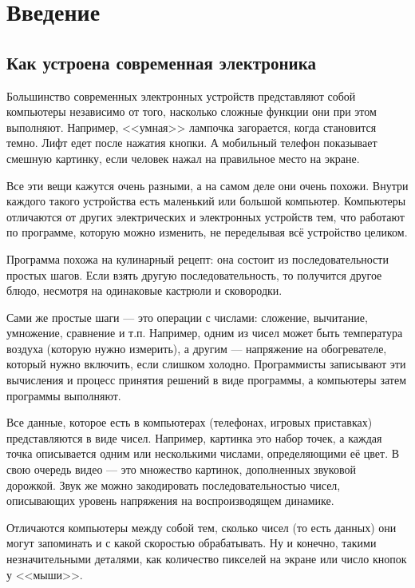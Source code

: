 \chapter{Введение}

\section*{Как устроена современная электроника}

Большинство современных электронных устройств представляют собой компьютеры
независимо от того, насколько сложные функции они при этом выполняют.
Например, <<умная>> лампочка загорается, когда становится темно.
Лифт едет после нажатия кнопки. А мобильный телефон показывает смешную
картинку, если человек нажал на правильное место на экране.

Все эти вещи кажутся очень разными, а на самом деле они очень похожи.
Внутри каждого такого устройства есть маленький или большой компьютер.
Компьютеры отличаются от других электрических и электронных устройств тем,
что работают по программе, которую можно изменить, не переделывая всё устройство
целиком.

Программа похожа на кулинарный рецепт: она состоит из последовательности
простых шагов. Если взять другую последовательность, то получится другое блюдо,
несмотря на одинаковые кастрюли и сковородки.

Сами же простые шаги --- это операции с числами: сложение, вычитание, умножение,
сравнение и т.п.
Например, одним из чисел может быть температура воздуха (которую нужно измерить),
а другим --- напряжение на обогревателе, который нужно включить, если слишком холодно.
Программисты записывают эти вычисления и процесс принятия решений в виде программы,
а компьютеры затем программы выполняют.

Все данные, которое есть в компьютерах (телефонах, игровых приставках) представляются
в виде чисел. Например, картинка это набор точек, а каждая точка описывается одним или
несколькими числами, определяющими её цвет. В свою очередь видео --- это множество картинок, дополненных
звуковой дорожкой. Звук же можно закодировать последовательностью чисел, описывающих
уровень напряжения на воспроизводящем динамике.

Отличаются компьютеры между собой тем, сколько чисел (то есть данных) они могут запоминать
и с какой скоростью обрабатывать. Ну и конечно, такими незначительными деталями,
как количество пикселей на экране или число кнопок у <<мыши>>.


